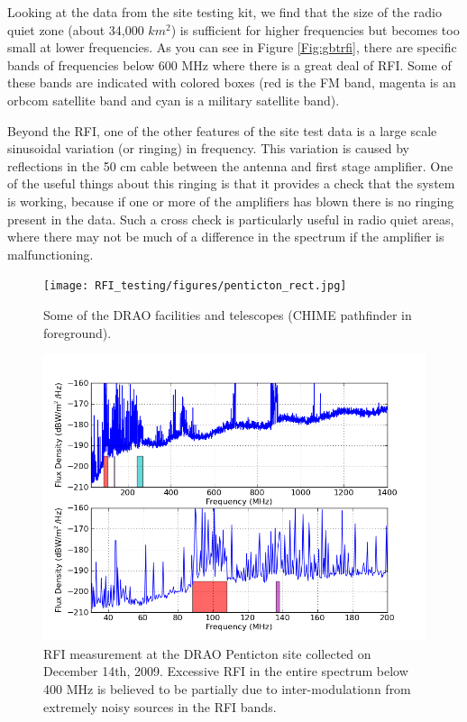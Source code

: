 Looking at the data from the site testing kit, we find that the size of the radio quiet zone (about 34,000 $km^2$) is sufficient for higher frequencies but becomes too small at lower frequencies. As you can see in Figure \ref{Fig:gbtrfi}, there are specific bands of frequencies below 600 MHz where there is a great deal of RFI. Some of these bands are indicated with colored boxes (red is the FM band, magenta is an orbcom satellite band and cyan is a military satellite band). 

Beyond the RFI, one of the other features of the site test data is a large scale sinusoidal variation (or ringing) in frequency. This variation is caused by reflections in the 50 cm cable between the antenna and first stage amplifier. One of the useful things about this ringing is that it provides a check that the system is working, because if one or more of the amplifiers has blown there is no ringing present in the data. Such a cross check is particularly useful in radio quiet areas, where there may not be much of a difference in the spectrum if the amplifier is malfunctioning. 

\begin{figure}[htb]
\begin{center}
\texttt{[image: RFI\_testing/figures/penticton\_rect.jpg]}
\caption{Some of the DRAO facilities and telescopes (CHIME pathfinder in foreground). }
\label{Fig:penticton}
\end{center}
\end{figure}

\begin{figure}[htb]
\begin{center}
\includegraphics[width=0.9\linewidth]{RFI_testing/figures/DRAO_bands.png}
\caption{RFI measurement at the DRAO Penticton site collected on December 14th, 2009. Excessive RFI in the entire spectrum below 400 MHz is believed to be partially due to inter-modulationn from extremely noisy sources in the RFI bands. }
\label{Fig:draorfi}
\end{center}
\end{figure}

